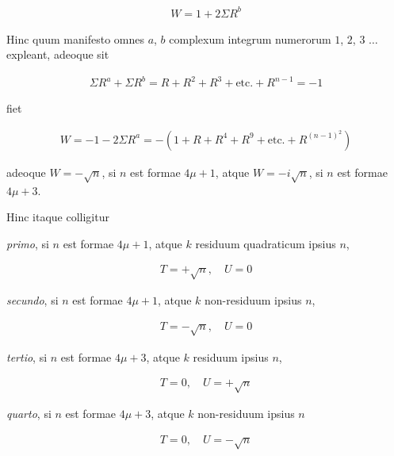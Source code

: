 \[
\begin{aligned}
W=1+2\Sigma R^b
\end{aligned}
\]

Hinc quum manifesto omnes $a$, $b$ complexum integrum numerorum $1$, $2$, $3$ $\ldots$ expleant, adeoque sit

\[
\begin{aligned}
\Sigma R^a+\Sigma R^b=R+R^2+R^3+\text{etc.}+R^{n-1}=-1
\end{aligned}
\]

fiet

\[
\begin{aligned}
W=-1-2\Sigma R^a=-(1+R+R^4+R^9+\text{etc.}+R^{(n-1)^2})
\end{aligned}
\]

adeoque $W=-\surd n$, si $n$ est formae $4\mu+1$, atque $W=-i\surd n$, si $n$ est formae $4\mu+3$.

Hinc itaque colligitur

\emph{primo}, si $n$ est formae $4\mu+1$, atque $k$ residuum quadraticum ipsius $n$,

\[
\begin{aligned}
T=+\surd n,\quad U=0
\end{aligned}
\]

\emph{secundo}, si $n$ est formae $4\mu+1$, atque $k$ non-residuum ipsius $n$,

\[
\begin{aligned}
T=-\surd n,\quad U=0
\end{aligned}
\]

\emph{tertio}, si $n$ est formae $4\mu+3$, atque $k$ residuum ipsius $n$,

\[
\begin{aligned}
T=0,\quad U=+\surd n
\end{aligned}
\]

\emph{quarto}, si $n$ est formae $4\mu+3$, atque $k$ non-residuum ipsius $n$

\[
\begin{aligned}
T=0,\quad U=-\surd n
\end{aligned}
\]
